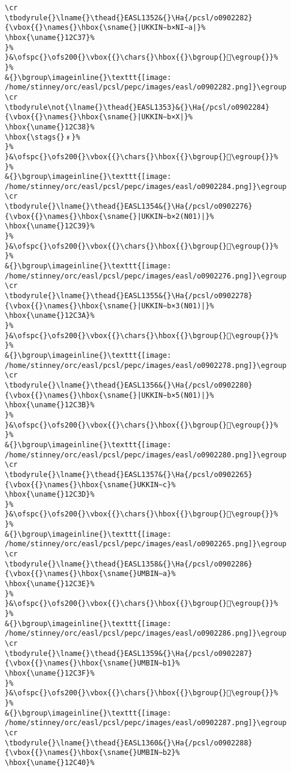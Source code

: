\begin{verbatim}
\cr
\tbodyrule{}\lname{}\thead{}EASL1352&{}\Ha{/pcsl/o0902282}{\vbox{{}\names{}\hbox{\sname{}|UKKIN∼b×NI∼a|}%
\hbox{\uname{}12C37}%
}%
}&\ofspc{}\ofs200{}\vbox{{}\chars{}\hbox{{}\bgroup{}𒰷\egroup{}}%
}%
&{}\bgroup\imageinline{}\texttt{[image: /home/stinney/orc/easl/pcsl/pepc/images/easl/o0902282.png]}\egroup
\cr
\tbodyrule\not{\lname{}\thead{}EASL1353}&{}\Ha{/pcsl/o0902284}{\vbox{{}\names{}\hbox{\sname{}|UKKIN∼b×X|}%
\hbox{\uname{}12C38}%
\hbox{\stags{}﹟}%
}%
}&\ofspc{}\ofs200{}\vbox{{}\chars{}\hbox{{}\bgroup{}𒰸\egroup{}}%
}%
&{}\bgroup\imageinline{}\texttt{[image: /home/stinney/orc/easl/pcsl/pepc/images/easl/o0902284.png]}\egroup
\cr
\tbodyrule{}\lname{}\thead{}EASL1354&{}\Ha{/pcsl/o0902276}{\vbox{{}\names{}\hbox{\sname{}|UKKIN∼b×2(N01)|}%
\hbox{\uname{}12C39}%
}%
}&\ofspc{}\ofs200{}\vbox{{}\chars{}\hbox{{}\bgroup{}𒰹\egroup{}}%
}%
&{}\bgroup\imageinline{}\texttt{[image: /home/stinney/orc/easl/pcsl/pepc/images/easl/o0902276.png]}\egroup
\cr
\tbodyrule{}\lname{}\thead{}EASL1355&{}\Ha{/pcsl/o0902278}{\vbox{{}\names{}\hbox{\sname{}|UKKIN∼b×3(N01)|}%
\hbox{\uname{}12C3A}%
}%
}&\ofspc{}\ofs200{}\vbox{{}\chars{}\hbox{{}\bgroup{}𒰺\egroup{}}%
}%
&{}\bgroup\imageinline{}\texttt{[image: /home/stinney/orc/easl/pcsl/pepc/images/easl/o0902278.png]}\egroup
\cr
\tbodyrule{}\lname{}\thead{}EASL1356&{}\Ha{/pcsl/o0902280}{\vbox{{}\names{}\hbox{\sname{}|UKKIN∼b×5(N01)|}%
\hbox{\uname{}12C3B}%
}%
}&\ofspc{}\ofs200{}\vbox{{}\chars{}\hbox{{}\bgroup{}𒰻\egroup{}}%
}%
&{}\bgroup\imageinline{}\texttt{[image: /home/stinney/orc/easl/pcsl/pepc/images/easl/o0902280.png]}\egroup
\cr
\tbodyrule{}\lname{}\thead{}EASL1357&{}\Ha{/pcsl/o0902265}{\vbox{{}\names{}\hbox{\sname{}UKKIN∼c}%
\hbox{\uname{}12C3D}%
}%
}&\ofspc{}\ofs200{}\vbox{{}\chars{}\hbox{{}\bgroup{}𒰽\egroup{}}%
}%
&{}\bgroup\imageinline{}\texttt{[image: /home/stinney/orc/easl/pcsl/pepc/images/easl/o0902265.png]}\egroup
\cr
\tbodyrule{}\lname{}\thead{}EASL1358&{}\Ha{/pcsl/o0902286}{\vbox{{}\names{}\hbox{\sname{}UMBIN∼a}%
\hbox{\uname{}12C3E}%
}%
}&\ofspc{}\ofs200{}\vbox{{}\chars{}\hbox{{}\bgroup{}𒰾\egroup{}}%
}%
&{}\bgroup\imageinline{}\texttt{[image: /home/stinney/orc/easl/pcsl/pepc/images/easl/o0902286.png]}\egroup
\cr
\tbodyrule{}\lname{}\thead{}EASL1359&{}\Ha{/pcsl/o0902287}{\vbox{{}\names{}\hbox{\sname{}UMBIN∼b1}%
\hbox{\uname{}12C3F}%
}%
}&\ofspc{}\ofs200{}\vbox{{}\chars{}\hbox{{}\bgroup{}𒰿\egroup{}}%
}%
&{}\bgroup\imageinline{}\texttt{[image: /home/stinney/orc/easl/pcsl/pepc/images/easl/o0902287.png]}\egroup
\cr
\tbodyrule{}\lname{}\thead{}EASL1360&{}\Ha{/pcsl/o0902288}{\vbox{{}\names{}\hbox{\sname{}UMBIN∼b2}%
\hbox{\uname{}12C40}%

\end{verbatim}
